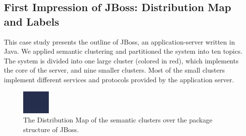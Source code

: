 \documentclass[10pt]{book}
\begin{document}
\subsection{First Impression of JBoss: Distribution Map and Labels}\label{sec:azureus}

This case study presents the outline of JBoss, an application-server written in Java. We applied semantic clustering and partitioned the system into ten topics. The system is divided into one large cluster (colored in red), which implements the core of the server, and nine smaller clusters. Most of the small clusters implement different services and protocols provided by the application server.

\begin{figure}[htbp]
\begin{center}
  \includegraphics[width=\linewidth]{JBossDistribution}
  \caption{The Distribution Map of the semantic clusters over the package structure of JBoss.}
  \label{fig:JBossDistribution}
\end{center}
\end{figure}
\end{document}
